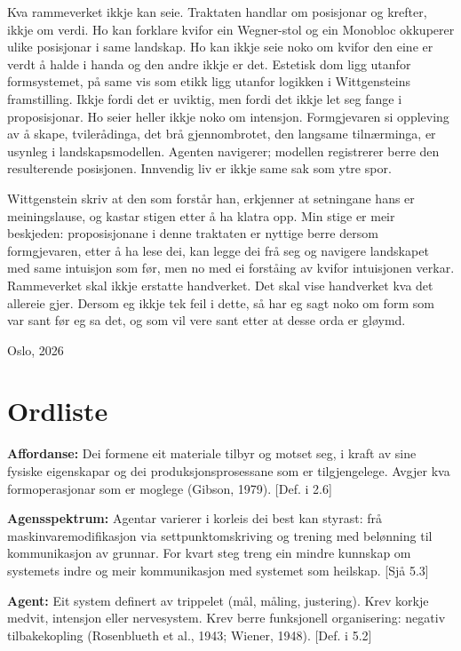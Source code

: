 \documentclass[10pt]{article}
\begin{document}
Kva rammeverket ikkje kan seie. Traktaten handlar om posisjonar og krefter, ikkje om verdi. Ho kan forklare kvifor ein Wegner-stol og ein Monobloc okkuperer ulike posisjonar i same landskap. Ho kan ikkje seie noko om kvifor den eine er verdt å halde i handa og den andre ikkje er det. Estetisk dom ligg utanfor formsystemet, på same vis som etikk ligg utanfor logikken i Wittgensteins framstilling. Ikkje fordi det er uviktig, men fordi det ikkje let seg fange i proposisjonar. Ho seier heller ikkje noko om intensjon. Formgjevaren si oppleving av å skape, tvilerådinga, det brå gjennombrotet, den langsame tilnærminga, er usynleg i landskapsmodellen. Agenten navigerer; modellen registrerer berre den resulterende posisjonen. Innvendig liv er ikkje same sak som ytre spor.

Wittgenstein skriv at den som forstår han, erkjenner at setningane hans er meiningslause, og kastar stigen etter å ha klatra opp. Min stige er meir beskjeden: proposisjonane i denne traktaten er nyttige berre dersom formgjevaren, etter å ha lese dei, kan legge dei frå seg og navigere landskapet med same intuisjon som før, men no med ei forståing av kvifor intuisjonen verkar. Rammeverket skal ikkje erstatte handverket. Det skal vise handverket kva det allereie gjer. Dersom eg ikkje tek feil i dette, så har eg sagt noko om form som var sant før eg sa det, og som vil vere sant etter at desse orda er gløymd.

Oslo, 2026


\chapter*{Ordliste}




\textbf{Affordanse:} Dei formene eit materiale tilbyr og motset seg, i kraft av sine fysiske eigenskapar og dei produksjonsprosessane som er tilgjengelege. Avgjer kva formoperasjonar som er moglege (Gibson, 1979). [Def. i 2.6]




\textbf{Agensspektrum:} Agentar varierer i korleis dei best kan styrast: frå maskinvaremodifikasjon via settpunktomskriving og trening med belønning til kommunikasjon av grunnar. For kvart steg treng ein mindre kunnskap om systemets indre og meir kommunikasjon med systemet som heilskap. [Sjå 5.3]




\textbf{Agent:} Eit system definert av trippelet (mål, måling, justering). Krev korkje medvit, intensjon eller nervesystem. Krev berre funksjonell organisering: negativ tilbakekopling (Rosenblueth et al., 1943; Wiener, 1948). [Def. i 5.2]
\end{document}

